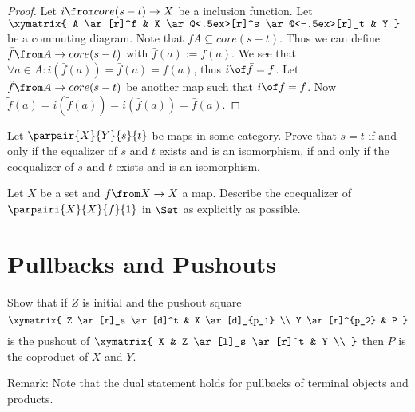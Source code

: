 \begin{answer}
  \begin{proof}
    Let $i \from core(s-t) \to X$ be a inclusion function. Let
    $\xymatrix{
      A \ar[r]^f & X \ar@<.5ex>[r]^s \ar@<-.5ex>[r]_t & Y
    }$
    be a commuting diagram. Note that $f A \subseteq core(s-t)$.
    Thus we can define $\bar{f} \from A \to core(s-t)$ with $\bar{f}(a) := f(a)$.
    We see that $\forall a \in A: i(\bar{f}(a))=\bar{f}(a)=f(a)$, thus $i \of \bar{f} = f$.
    Let $\tilde{f} \from A \to core(s-t)$ be another map such that $i \of \tilde{f} = f$.
    Now $\tilde{f}(a) = i(\tilde{f}(a)) = i(\bar{f}(a)) = \bar{f}(a)$.
  \end{proof}
\end{answer}

\begin{exercise}
  Let $\parpair{X}{Y}{s}{t}$ be maps in some category.  Prove that $s = t$ if
  and only if the equalizer of $s$ and $t$ exists and is an isomorphism, if
  and only if the coequalizer of $s$ and $t$ exists and is an isomorphism.
\end{exercise}

\begin{exercise}
  Let $X$ be a set and $f\from X \to X$ a map.  Describe the coequalizer of
  $\parpairi{X}{X}{f}{1}$ in $\Set$ as explicitly as possible.
\end{exercise}

\section{Pullbacks and Pushouts}

\begin{exercise}
  Show that if $Z$ is initial and the pushout square
  \[ \xymatrix{
    Z \ar[r]_s \ar[d]^t & X \ar[d]_{p_1} \\
    Y \ar[r]^{p_2} & P
  } \]
  is the pushout of
  $ \xymatrix{
    X & Z \ar[l]_s \ar[r]^t & Y \\
  } $
  then $P$ is the coproduct of $X$ and $Y$.

  Remark: Note that the dual statement holds for pullbacks of terminal objects and products.
\end{exercise}

